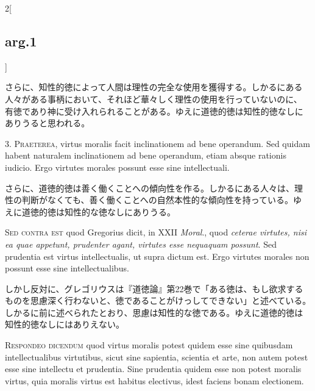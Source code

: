 \documentclass[paper=a4paper,fontsize=10pt,jafontsize=9pt,titlepage]{jlreq}
\begin{document}
\begin{paracol}{2}[\subsection{arg.1}]
\switchcolumn

さらに、知性的徳によって人間は理性の完全な使用を獲得する。しかるにある
人々がある事柄において、それほど華々しく理性の使用を行っていないのに、
有徳であり神に受け入れられることがある。ゆえに道徳的徳は知性的徳なしに
ありうると思われる。


3. {\scshape Praeterea}, virtus moralis facit inclinationem ad bene
operandum. Sed quidam habent naturalem inclinationem ad bene
operandum, etiam absque rationis iudicio. Ergo virtutes morales
possunt esse sine intellectuali.

\switchcolumn

さらに、道徳的徳は善く働くことへの傾向性を作る。しかるにある人々は、理
性の判断がなくても、善く働くことへの自然本性的な傾向性を持っている。ゆ
えに道徳的徳は知性的な徳なしにありうる。

\switchcolumn*[\subsection{s.c.}]

{\scshape Sed contra est} quod Gregorius dicit, in XXII {\itshape
Moral}., quod {\itshape ceterae virtutes, nisi ea quae appetunt,
prudenter agant, virtutes esse nequaquam possunt}. Sed prudentia est
virtus intellectualis, ut supra dictum est. Ergo virtutes morales non
possunt esse sine intellectualibus.

\switchcolumn

しかし反対に、グレゴリウスは『道徳論』第22巻で「ある徳は、もし欲求する
ものを思慮深く行わないと、徳であることがけっしてできない」と述べている。
しかるに前に述べられたとおり、思慮は知性的な徳である。ゆえに道徳的徳は
知性的徳なしにはありえない。


{\scshape Respondeo dicendum} quod virtus moralis potest quidem esse
sine quibusdam intellectualibus virtutibus, sicut sine sapientia,
scientia et arte, non autem potest esse sine intellectu et
prudentia. Sine prudentia quidem esse non potest moralis virtus, quia
moralis virtus est habitus electivus, idest faciens bonam electionem.


\end{paracol}
\end{document}
